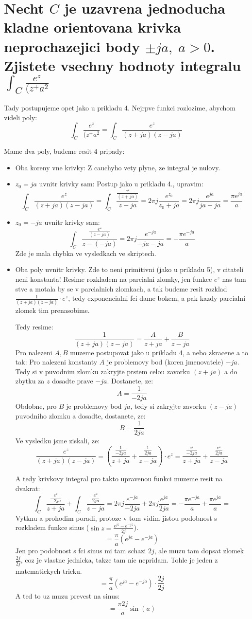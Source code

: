 \newpage

\section{Necht $C$ je uzavrena jednoducha kladne orientovana krivka neprochazejici body $\pm ja, \; a>0$. Zjistete vsechny hodnoty integralu $\int_C \frac{e^z}{(z^+a^2}$}

Tady postupujeme opet jako u prikladu 4. Nejrpve funkci rozlozime, abychom videli poly:
$$\int_C \frac{e^z}{(z^+a^2} = \int_C \frac{e^z}{(z+ja)(z-ja)}$$

Mame dva poly, budeme resit 4 pripady:
\begin{itemize}
\item Oba koreny vne krivky: Z cauchyho vety plyne, ze integral je nulovy.
\item $z_0 = ja$ uvnitr krivky sam: Postup jako u prikladu 4., upravim:
$$\int_C \frac{e^z}{(z+ja)(z-ja)} = \int_C \frac{\frac{e^z}{(z+ja)}}{z-ja} = 2\pi j \frac{e^{z_0}}{z_0+ja} = 2\pi j \frac{e^{ja}}{ja+ja} = \frac{\pi e^{ja}}{a}$$
\item $z_0 = -ja$ uvnitr krivky sam: 
$$\int_C \frac{\frac{e^z}{(z-ja)}}{z-(-ja)} = 2\pi j \frac{e^{-ja}}{-ja-ja} = -\frac{\pi e^{-ja}}{a}$$
Zde je mala chybka ve vysledkach ve skriptech.
\item Oba poly uvnitr krivky. Zde to neni primitivni (jako u prikladu 5), v citateli neni konstanta! Resime rozkladem na parcialni zlomky, jen funkce $e^z$ nas tam stve a motala by se v parcialnich zlomkach, a tak budeme resit rozklad $\frac{1}{(z+ja)(z-ja)}\cdot e^z$, tedy exponencialni fci dame bokem, a pak kazdy parcialni zlomek tim prenasobime.

Tedy resime:
$$\frac{1}{(z+ja)(z-ja)} = \frac{A}{z+ja} + \frac{B}{z-ja}$$
Pro nalezeni $A, B$ muzeme postupovat jako u prikladu 4, a nebo zkracene a to tak: Pro nalezeni konstanty $A$ je problemovy bod (koren jmenovatele) $-ja$. Tedy si v puvodnim zlomku zakryjte prstem celou zavorku $(z+ja)$ a do zbytku za $z$ dosadte prave $-ja$. Dostanete, ze:
$$A = \frac{1}{-2ja}$$
Obdobne, pro $B$ je problemovy bod $ja$, tedy si zakryjte zavorku $(z-ja)$ puvodniho zlomku a dosadte, dostanete, ze:
$$B = \frac{1}{2ja}$$
Ve vysledku jsme ziskali, ze:
$$\frac{e^z}{(z+ja)(z-ja)} = \left( \frac{\frac{1}{-2ja}}{z+ja} + \frac{\frac{1}{2ja}}{z-ja} \right) \cdot e^z = \frac{\frac{e^z}{-2ja}}{z+ja} + \frac{\frac{e^z}{2ja}}{z-ja} $$

A tedy krivkovy integral pro takto upravenou funkci muzeme resit na dvakrat:
$$\int_C  \frac{\frac{e^z}{-2ja}}{z+ja} + \int_C \frac{\frac{e^z}{2ja}}{z-ja} = 2\pi j \frac{e^{-ja}}{-2ja} + 2\pi j \frac{e^{ja}}{2ja} = -\frac{\pi e^{-ja}}{a}+ \frac{\pi e^{ja}}{a} =$$
Vytknu a prohodim poradi, protoze v tom vidim jistou podobnost s rozkladem funkce sinus ($\operatorname{sin}z = \frac{e^{jz} - e^{-jz}}{2j}$).
 $$ = \frac{\pi}{a} (e^{ja}-e^{-ja})$$
 Jen pro podobnost s fci sinus mi tam schazi $2j$, ale muzu tam dopsat zlomek $\frac{2j}{2j}$, coz je vlastne jednicka, takze tam nic nepridam. Tohle je jeden z matematickych tricku.
 $$ = \frac{\pi}{a} (e^{ja}-e^{-ja}) \cdot \frac{2j}{2j}$$
 A ted to uz muzu prevest na sinus:
 $$ = \frac{\pi 2j}{a} \operatorname{sin}(a)$$
\end{itemize}

